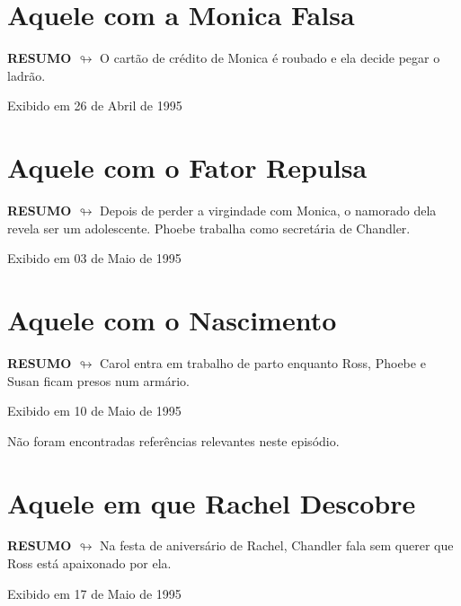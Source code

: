 \chapter{Aquele com a Monica Falsa}

\textbf{RESUMO $\looparrowright$} O cartão de crédito de Monica é roubado e ela decide pegar o ladrão.

\begin{flushright}
\textcolor{gray600}{Exibido em 26 de Abril de 1995}
\end{flushright}


\chapter{Aquele com o Fator Repulsa}

\textbf{RESUMO $\looparrowright$} Depois de perder a virgindade com Monica, o namorado dela revela ser um adolescente. Phoebe trabalha como secretária de Chandler.

\begin{flushright}
\textcolor{gray600}{Exibido em 03 de Maio de 1995}
\end{flushright}


\chapter{Aquele com o Nascimento}

\textbf{RESUMO $\looparrowright$} Carol entra em trabalho de parto enquanto Ross, Phoebe e Susan ficam presos num armário.

\begin{flushright}
\textcolor{gray600}{Exibido em 10 de Maio de 1995}
\end{flushright}
Não foram encontradas referências relevantes neste episódio.

\chapter{Aquele em que Rachel Descobre}

\textbf{RESUMO $\looparrowright$} Na festa de aniversário de Rachel, Chandler fala sem querer que Ross está apaixonado por ela.

\begin{flushright}
\textcolor{gray600}{Exibido em 17 de Maio de 1995}
\end{flushright}


